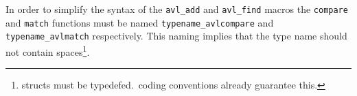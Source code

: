 In order to simplify the syntax of the \texttt{avl\_add} and \texttt{avl\_find}
macros the \texttt{compare} and \texttt{match} functions must be named \texttt{typename\_avlcompare}
and \texttt{typename\_avlmatch} respectively. This naming implies that the type name 
should not contain spaces\footnote{\textsf{struct}s must be typedefed.\acaros\ coding conventions
already guarantee this.}.

